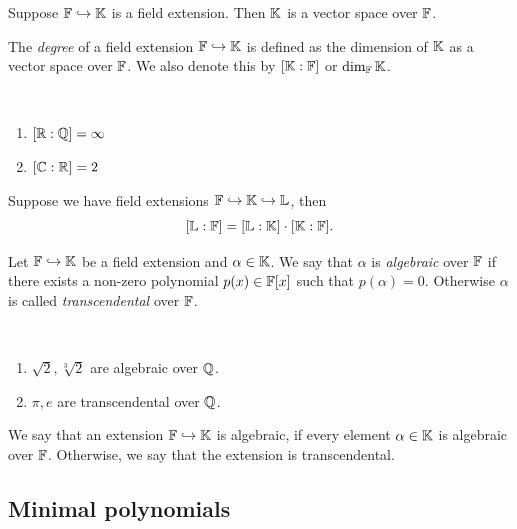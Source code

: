 \begin{remark}
    Suppose $\mathbb{F} \hookrightarrow \mathbb{K}$ is a field extension. Then $\mathbb{K}$ is a vector space over $\mathbb{F}$.
\end{remark}

\begin{definition}
    The \emph{degree} of a field extension $\mathbb{F} \hookrightarrow \mathbb{K}$ is defined as the dimension of $\mathbb{K}$ as a vector space over $\mathbb{F}$. We also denote this by $[\mathbb{K} : \mathbb{F}]$ or $\dim_{\mathbb{F}} \mathbb{K}$.
\end{definition}

\begin{example}{\ }
    \begin{enumerate}
        \item $[\mathbb{R} : \mathbb{Q}] = \infty$
        \item $[\mathbb{C} : \mathbb{R}] = 2$
    \end{enumerate}
\end{example}

\begin{lemma}
    Suppose we have field extensions $\mathbb{F} \hookrightarrow \mathbb{K} \hookrightarrow \mathbb{L}$, then
    \[
        [\mathbb{L} : \mathbb{F}] = [\mathbb{L} : \mathbb{K}] \cdot [\mathbb{K} : \mathbb{F}].
    \]
\end{lemma}

\begin{definition}
    Let $\mathbb{F} \hookrightarrow \mathbb{K}$ be a field extension and $\alpha \in \mathbb{K}$. We say that $\alpha$ is \emph{algebraic} over $\mathbb{F}$ if there exists a non-zero polynomial $p(x) \in \mathbb{F}[x]$ such that $p(\alpha) = 0$. Otherwise $\alpha$ is called \emph{transcendental} over $\mathbb{F}$.
\end{definition}

\begin{example}{\ }
    \begin{enumerate}
        \item $\sqrt{2}, \sqrt[3]{2}$ are algebraic over $\mathbb{Q}$.
        \item $\pi, e$ are transcendental over $\mathbb{Q}$.
    \end{enumerate}
\end{example}

\begin{definition}
    We say that an extension $\mathbb{F} \hookrightarrow \mathbb{K}$ is algebraic, if every element $\alpha \in \mathbb{K}$ is algebraic over $\mathbb{F}$. Otherwise, we say that the extension is transcendental.
\end{definition}

\subsection{Minimal polynomials}


